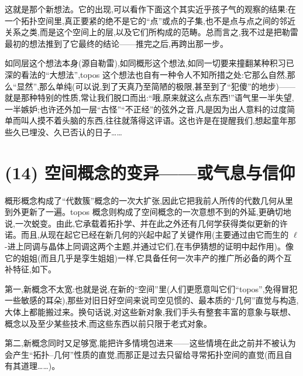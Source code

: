  这就是那个新想法。它的出现,可以看作下面这个其实近乎孩子气的观察的结果:在一个拓扑空间里,真正要紧的绝不是它的“点”或点的子集,也不是点与点之间的邻近关系之类,而是这个空间上的层,以及它们所构成的范畴。总而言之,我不过是把勒雷最初的想法推到了它最终的结论——推完之后,再跨出那一步。

如同层这个想法本身(源自勒雷),如同概形这个想法,如同一切要来撞翻某种积习已深的看法的“大想法”,topos 这个想法也自有一种令人不知所措之处:它那么自然,那么“显然”,那么单纯(可以说,到了天真乃至简陋的极限,甚至到了“犯傻”的地步)——就是那种特别的性质,常让我们脱口而出:“哦,原来就这么点东西!”语气里一半失望,一半嫉妒;也许还外加一层“古怪”“不正经”的弦外之音,凡是因为出人意料的过度简单而叫人摸不着头脑的东西,往往就落得这评语。这也许是在提醒我们,想起童年那些久已埋没、久已否认的日子……

\section{(14) 空间概念的变异——或气息与信仰}

概形概念构成了“代数簇”概念的一次大扩张,因此它把我前人所传的代数几何从里到外更新了一遍。topos 概念则构成了空间概念的一次意想不到的外延,更确切地说,一次蜕变。由此,它承载着拓扑学、并在此之外还有几何学获得类似更新的许诺。而且,从现在起它已经在新几何的兴起中起了关键作用(主要通过由它而生的 $\ell$-进上同调与晶体上同调这两个主题,并通过它们,在韦伊猜想的证明中起作用)。像它的姐姐(而且几乎是孪生姐姐)一样,它具备任何一次丰产的推广所必备的两个互补特征,如下。

 第一,新概念不太宽:也就是说,在新的“空间”里(人们更愿意叫它们“topos”,免得冒犯一些敏感的耳朵),那些对旧日好空间来说司空见惯的、最本质的“几何”直觉与构造,大体上都能搬过来。换句话说,对这些新对象,我们手头有整套丰富的意象与联想、概念以及至少某些技术,而这些东西以前只限于老式对象。

第二,新概念同时又足够宽,能把许多情境包进来——这些情境在此之前并不被认为会产生“拓扑–几何”性质的直觉,而那正是过去只留给寻常拓扑空间的直觉(而且自有其道理……)。

